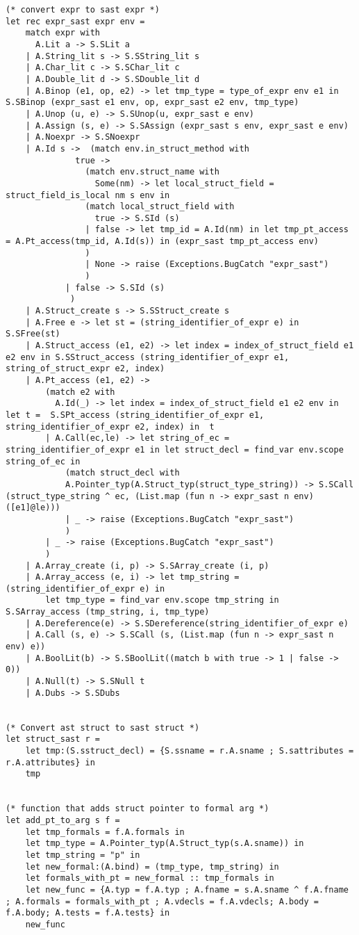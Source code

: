 \documentclass{article}
\begin{document}
\begin{lstlisting}
(* convert expr to sast expr *)
let rec expr_sast expr env =
	match expr with
	  A.Lit a -> S.SLit a
	| A.String_lit s -> S.SString_lit s	
	| A.Char_lit c -> S.SChar_lit c
	| A.Double_lit d -> S.SDouble_lit d
	| A.Binop (e1, op, e2) -> let tmp_type = type_of_expr env e1 in S.SBinop (expr_sast e1 env, op, expr_sast e2 env, tmp_type)
	| A.Unop (u, e) -> S.SUnop(u, expr_sast e env)
	| A.Assign (s, e) -> S.SAssign (expr_sast s env, expr_sast e env)
	| A.Noexpr -> S.SNoexpr
	| A.Id s ->  (match env.in_struct_method with
			  true -> 
				(match env.struct_name with
				  Some(nm) -> let local_struct_field = struct_field_is_local nm s env in 
				(match local_struct_field with
				  true -> S.SId (s)
				| false -> let tmp_id = A.Id(nm) in let tmp_pt_access = A.Pt_access(tmp_id, A.Id(s)) in (expr_sast tmp_pt_access env)
				)
				| None -> raise (Exceptions.BugCatch "expr_sast")
				)
			| false -> S.SId (s)
		     )
	| A.Struct_create s -> S.SStruct_create s
	| A.Free e -> let st = (string_identifier_of_expr e) in S.SFree(st)
	| A.Struct_access (e1, e2) -> let index = index_of_struct_field e1 e2 env in S.SStruct_access (string_identifier_of_expr e1, string_of_struct_expr e2, index)
	| A.Pt_access (e1, e2) ->  
		(match e2 with
		  A.Id(_) -> let index = index_of_struct_field e1 e2 env in let t =  S.SPt_access (string_identifier_of_expr e1, string_identifier_of_expr e2, index) in  t
		| A.Call(ec,le) -> let string_of_ec = string_identifier_of_expr e1 in let struct_decl = find_var env.scope string_of_ec in
			(match struct_decl with
			A.Pointer_typ(A.Struct_typ(struct_type_string)) -> S.SCall (struct_type_string ^ ec, (List.map (fun n -> expr_sast n env) ([e1]@le)))
			| _ -> raise (Exceptions.BugCatch "expr_sast")
			)
		| _ -> raise (Exceptions.BugCatch "expr_sast")
		)
	| A.Array_create (i, p) -> S.SArray_create (i, p)
	| A.Array_access (e, i) -> let tmp_string = (string_identifier_of_expr e) in 
		let tmp_type = find_var env.scope tmp_string in S.SArray_access (tmp_string, i, tmp_type)
	| A.Dereference(e) -> S.SDereference(string_identifier_of_expr e) 
	| A.Call (s, e) -> S.SCall (s, (List.map (fun n -> expr_sast n env) e))
	| A.BoolLit(b) -> S.SBoolLit((match b with true -> 1 | false -> 0))
	| A.Null(t) -> S.SNull t
	| A.Dubs -> S.SDubs


(* Convert ast struct to sast struct *)
let struct_sast r = 
	let tmp:(S.sstruct_decl) = {S.ssname = r.A.sname ; S.sattributes = r.A.attributes} in
	tmp


(* function that adds struct pointer to formal arg *)
let add_pt_to_arg s f =
	let tmp_formals = f.A.formals in
	let tmp_type = A.Pointer_typ(A.Struct_typ(s.A.sname)) in 
	let tmp_string = "p" in
	let new_formal:(A.bind) = (tmp_type, tmp_string) in
	let formals_with_pt = new_formal :: tmp_formals in
	let new_func = {A.typ = f.A.typ ; A.fname = s.A.sname ^ f.A.fname ; A.formals = formals_with_pt ; A.vdecls = f.A.vdecls; A.body = f.A.body; A.tests = f.A.tests} in 
	new_func


\end{lstlisting}
\end{document}
